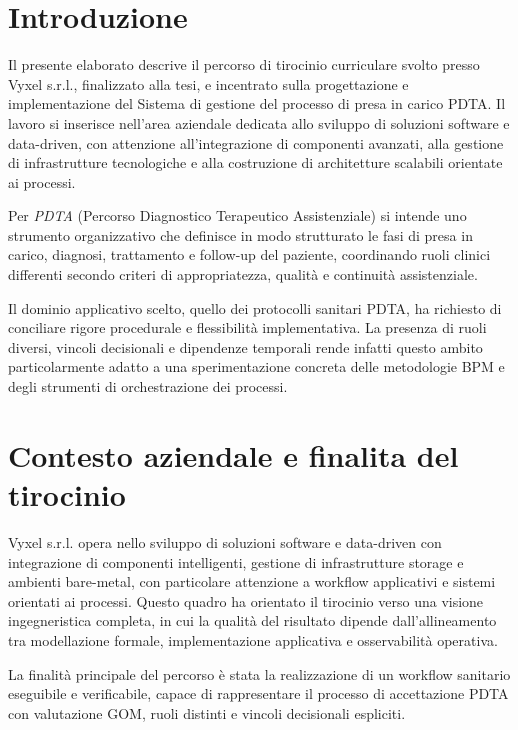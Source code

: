 \documentclass[12pt,a4paper]{article}
\begin{document}
\section*{Introduzione}

Il presente elaborato descrive il percorso di tirocinio curriculare svolto presso Vyxel s.r.l., finalizzato alla tesi, e incentrato sulla progettazione e implementazione del Sistema di gestione del processo di presa in carico PDTA. Il lavoro si inserisce nell'area aziendale dedicata allo sviluppo di soluzioni software e data-driven, con attenzione all'integrazione di componenti avanzati, alla gestione di infrastrutture tecnologiche e alla costruzione di architetture scalabili orientate ai processi.

Per \emph{PDTA} (Percorso Diagnostico Terapeutico Assistenziale) si intende uno strumento organizzativo che definisce in modo strutturato le fasi di presa in carico, diagnosi, trattamento e follow-up del paziente, coordinando ruoli clinici differenti secondo criteri di appropriatezza, qualità e continuità assistenziale.

Il dominio applicativo scelto, quello dei protocolli sanitari PDTA, ha richiesto di conciliare rigore procedurale e flessibilità implementativa. La presenza di ruoli diversi, vincoli decisionali e dipendenze temporali rende infatti questo ambito particolarmente adatto a una sperimentazione concreta delle metodologie BPM e degli strumenti di orchestrazione dei processi.

\section{Contesto aziendale e finalita del tirocinio}

Vyxel s.r.l. opera nello sviluppo di soluzioni software e data-driven con integrazione di componenti intelligenti, gestione di infrastrutture storage e ambienti bare-metal, con particolare attenzione a workflow applicativi e sistemi orientati ai processi. Questo quadro ha orientato il tirocinio verso una visione ingegneristica completa, in cui la qualità del risultato dipende dall'allineamento tra modellazione formale, implementazione applicativa e osservabilità operativa.

La finalità principale del percorso è stata la realizzazione di un workflow sanitario eseguibile e verificabile, capace di rappresentare il processo di accettazione PDTA con valutazione GOM, ruoli distinti e vincoli decisionali espliciti.
\end{document}
